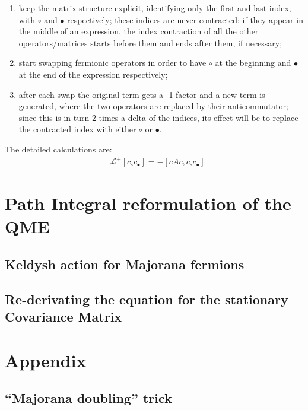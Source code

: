 \documentclass[a4paper,11pt]{article}
\newcommand{\nl}{\vskip 0.3cm}
\newcommand{\ubar}[1]{\underline{#1}}
\begin{document}
  \begin{enumerate}
   \item keep the matrix structure explicit, identifying only the first and last index, with $ \circ$ and $\bullet$ respectively; \ubar{these indices are never contracted}: if they appear in the middle of an expression, the index contraction of all the other operators/matrices starts before them and ends after them, if necessary;
   \item start swapping fermionic operators in order to have $ \circ$ at the beginning and $\bullet$ at the end of the expression respectively; 
   \item after each swap the original term gets a -1 factor and a new term is generated, where the two operators are replaced by their anticommutator; since this is in turn 2 times a delta of the indices, its effect will be to replace the contracted index with either $ \circ$ or $\bullet$.
  \end{enumerate}\nl
  The detailed calculations are:
  \begin{align*}
   &\mathcal{L}^+\!\!\left[c_{\circ}c_{\bullet}\right] = - \left[cAc, c_{\circ} c_{\bullet}\right] 
  \end{align*}





  
 \section{Path Integral reformulation of the QME}
  \subsection{Keldysh action for Majorana fermions}
  \subsection{Re-derivating the equation for the stationary Covariance Matrix}

  \appendix
  \section*{Appendix}
    \renewcommand{\thesection}{A}
    \subsection{``Majorana doubling'' trick}
    \label{sec:majo_doubling_theory}
    
   
   
{}
  
\end{document}
